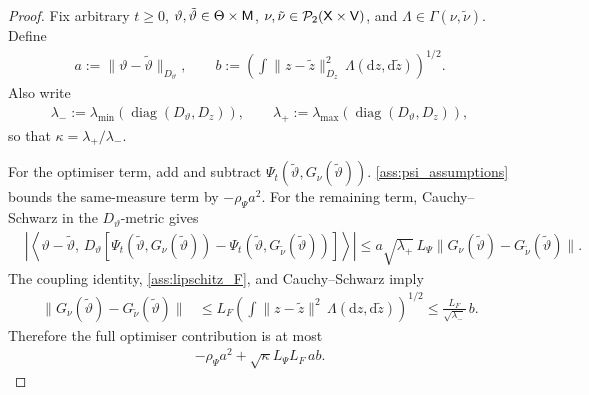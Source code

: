 \begin{proof}
Fix arbitrary $t\geq0$,
$\vartheta,\tilde\vartheta\in\Theta\times{\mathsf{M}}$,
$\nu,\tilde\nu\in\mathcal P_2({\mathsf{X}}\times{\mathsf{V}})$, and
$\Lambda\in\Gamma(\nu,\tilde\nu)$.  Define
\begin{align*}
a:=\|\vartheta-\tilde\vartheta\|_{D_\vartheta},
\qquad
b:=
\left(
\int\|z-\tilde z\|_{D_z}^2\,
\Lambda(\mathrm dz,\mathrm d\tilde z)
\right)^{1/2}.
\end{align*}
Also write
\begin{align*}
\lambda_-:=
\lambda_{\min}(\operatorname{diag}(D_\vartheta,D_z)),
\qquad
\lambda_+:=
\lambda_{\max}(\operatorname{diag}(D_\vartheta,D_z)),
\end{align*}
so that $\kappa=\lambda_+/\lambda_-$.

For the optimiser term, add and subtract
$\Psi_t(\tilde\vartheta,G_\nu(\tilde\vartheta))$.
\ref{ass:psi_assumptions} bounds the same-measure term by
$-\rho_\Psi a^2$.  For the remaining term, Cauchy--Schwarz in the
$D_\vartheta$-metric gives
\begin{align*}
&\left|
\left\langle
\vartheta-\tilde\vartheta,\,
D_\vartheta
\left[
\Psi_t(\tilde\vartheta,G_\nu(\tilde\vartheta))
-\Psi_t(\tilde\vartheta,G_{\tilde\nu}(\tilde\vartheta))
\right]
\right\rangle
\right|\leq
a\sqrt{\lambda_+}\,L_\Psi
\|G_\nu(\tilde\vartheta)-G_{\tilde\nu}(\tilde\vartheta)\|.
\end{align*}
The coupling identity, \ref{ass:lipschitz_F}, and
Cauchy--Schwarz imply
\begin{align*}
\|G_\nu(\tilde\vartheta)-G_{\tilde\nu}(\tilde\vartheta)\|
&\leq
L_F
\left(
\int\|z-\tilde z\|^2\,
\Lambda(\mathrm dz,\mathrm d\tilde z)
\right)^{1/2}\leq
\frac{L_F}{\sqrt{\lambda_-}}\,b.
\end{align*}
Therefore the full optimiser contribution is at most
\begin{align*}
-\rho_\Psi a^2+\sqrt\kappa L_\Psi L_F\,ab.
\end{align*}


\end{proof}
